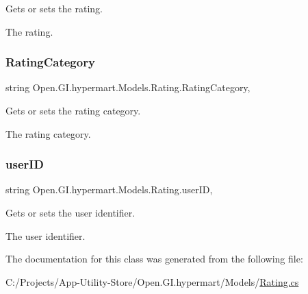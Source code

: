 Gets or sets the rating. 

The rating. \hypertarget{class_open_1_1_g_i_1_1hypermart_1_1_models_1_1_rating_a89b742b6bfd7d9aa0929b73c951fb37e}{}\label{class_open_1_1_g_i_1_1hypermart_1_1_models_1_1_rating_a89b742b6bfd7d9aa0929b73c951fb37e} 
\subsubsection{\texorpdfstring{Rating\+Category}{RatingCategory}}
{\footnotesize\ttfamily string Open.\+G\+I.\+hypermart.\+Models.\+Rating.\+Rating\+Category\hspace{0.3cm}{\ttfamily [get]}, {\ttfamily [set]}}



Gets or sets the rating category. 

The rating category. \hypertarget{class_open_1_1_g_i_1_1hypermart_1_1_models_1_1_rating_a1e8a569cc68356a222db0eee305273f2}{}\label{class_open_1_1_g_i_1_1hypermart_1_1_models_1_1_rating_a1e8a569cc68356a222db0eee305273f2} 
\subsubsection{\texorpdfstring{user\+ID}{userID}}
{\footnotesize\ttfamily string Open.\+G\+I.\+hypermart.\+Models.\+Rating.\+user\+ID\hspace{0.3cm}{\ttfamily [get]}, {\ttfamily [set]}}



Gets or sets the user identifier. 

The user identifier. 

The documentation for this class was generated from the following file\+:\begin{DoxyCompactItemize}
\item 
C\+:/\+Projects/\+App-\/\+Utility-\/\+Store/\+Open.\+G\+I.\+hypermart/\+Models/\hyperlink{_rating_8cs}{Rating.\+cs}\end{DoxyCompactItemize}
